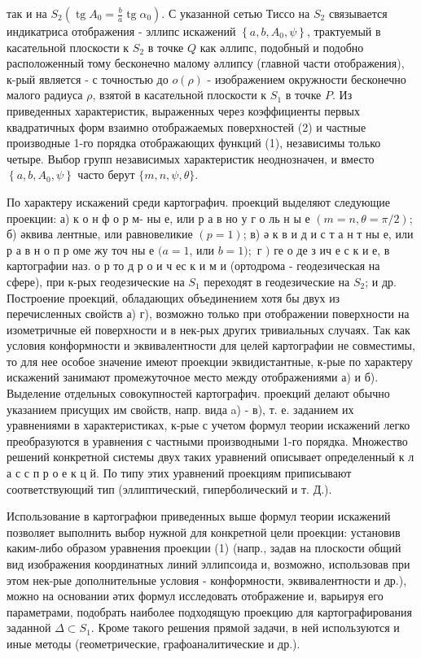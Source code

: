 \documentclass[10pt]{article}
\begin{document}
так и на $S_{2}\left(\operatorname{tg} A_{0}=\frac{b}{a} \operatorname{tg} \alpha_{0}\right)$. С указанной сетью Тиссо на $S_{2}$ связывается индикатриса отображения - эллипс искажений $\left\{a, b, A_{0}, \psi\right\}$, трактуемый в касательной плоскости к $S_{2}$ в точке $Q$ как әллипс, подобный и подобно расположенный тому бесконечно малому әллипсу (главной части отображения), к-рый является - с точностью до $o(\rho)$ - изображением окружности бесконечно малого радиуса $\rho$, взятой в касательной плоскости к $S_{1}$ в точке $P$. Из приведенных характеристик, выраженных через коэффициенты первых квадратичных форм взаимно отображаемых поверхностей (2) и частные производные 1-го порядка отображающих функций (1), независимы только четыре. Выбор групп независимых характеристик неоднозначен, и вместо $\left\{a, b, A_{0}, \psi\right\}$ часто берут $\{m, n, \psi, \theta\}$.



По характеру искажений среди картографич. проекций выделяют следующие проекции: а) к о н ф о р м- ны е, или р а в но у г о ль н ы е $(m=n, \theta=\pi / 2)$; б) әквива лентные, или равновеликие $(p=1)$; в) ә к в и д и с т а н т ны е, или р а в н о п р оме жу точ ны е $(a=1$, или $b=1) ;$ г $)$ ге о де з ич е с к и е, в картографии наз. о р то д р о и ч ес к и м и (ортодрома - геодезическая на сфере), при к-рых геодезические на $S_{1}$ переходят в геодезические на $S_{2}$; и др. Построение проекций, обладающих объединением хотя бы двух из перечисленных свойств а) г), возможно только при отображении поверхности на изометричные ей поверхности и в нек-рых других тривиальных случаях. Так как условия конформности и эквивалентности для целей картографии не совместимы, то для нее особое значение имеют проекции эквидистантные, к-рые по характеру искажений занимают промежуточное место между отображениями а) и б). Выделение отдельных совокупностей картографич. проекций делают обычно указанием присущих им свойств, напр. вида a) - в), т. е. заданием их уравнениями в характеристиках, к-рые с учетом формул теории искажений легко преобразуются в уравнения с частными производными 1-го порядка. Множество решений конкретной системы двух таких уравнений описывает определенный к л а с с п р о е к ц й. По типу этих уравнений проекциям приписывают соответствующий тип (эллиптический, гиперболический и т. Д.).



Использование в картографюи приведенных выше формул теории искажений позволяет выполнить выбор нужной для конкретной цели проекции: установив каким-либо образом уравнения проекции (1) (напр., задав на плоскости общий вид изображения координатных линий эллипсоида и, возможно, использовав при этом нек-рые дополнительные условия - конформности, эквивалентности и др.), можно на основании әтих формул исследовать отображение и, варьируя его параметрами, подобрать наиболее подходящую проекцию для картографирования заданной $\Delta \subset S_{1}$. Кроме такого решения прямой задачи, в ней используются и иные методы (геометрические, графоаналитические и др.).
\end{document}
